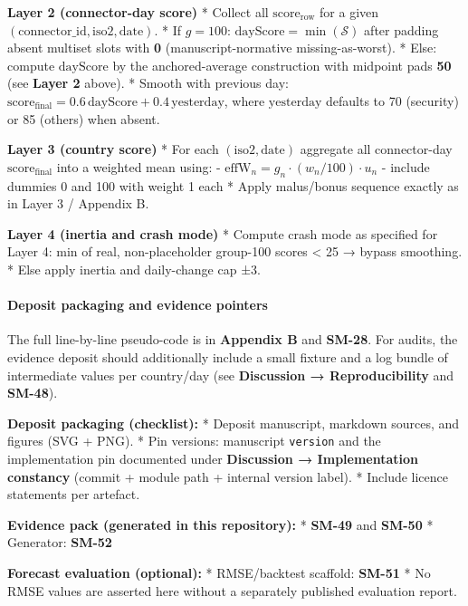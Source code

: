\documentclass[
  11pt,
  peerreview,journal,onecolumn]{IEEEtran}
\newcommand{\passthrough}[1]{#1}
\begin{document}
\textbf{Layer 2 (connector-day score)} * Collect all
\(\mathrm{score}_{\mathrm{row}}\) for a given
\((\mathrm{connector\_id},\mathrm{iso2},\mathrm{date})\). * If
\(g=100\): \(\mathrm{dayScore}=\min(\mathcal{S})\) after padding absent
multiset slots with \textbf{0} (manuscript-normative missing-as-worst).
* Else: compute \(\mathrm{dayScore}\) by the anchored-average
construction with midpoint pads \textbf{50} (see \textbf{Layer 2}
above). * Smooth with previous day:
\(\mathrm{score}_{\mathrm{final}}=0.6\,\mathrm{dayScore}+0.4\,\mathrm{yesterday}\),
where \(\mathrm{yesterday}\) defaults to 70 (security) or 85 (others)
when absent.

\textbf{Layer 3 (country score)} * For each
\((\mathrm{iso2},\mathrm{date})\) aggregate all connector-day
\(\mathrm{score}_{\mathrm{final}}\) into a weighted mean using: -
\(\mathrm{effW}_n=g_n\cdot(w_n/100)\cdot u_n\) - include dummies 0 and
100 with weight 1 each * Apply malus/bonus sequence exactly as in Layer
3 / Appendix B.

\textbf{Layer 4 (inertia and crash mode)} * Compute crash mode as
specified for Layer 4: min of real, non-placeholder group-100 scores
\textless{} 25 → bypass smoothing. * Else apply inertia and daily-change
cap ±3.

\hypertarget{deposit-packaging-and-evidence-pointers}{%
\paragraph{Deposit packaging and evidence
pointers}\label{deposit-packaging-and-evidence-pointers}}

The full line-by-line pseudo-code is in \textbf{Appendix B} and
\textbf{SM-28}. For audits, the evidence deposit should additionally
include a small fixture and a log bundle of intermediate values per
country/day (see \textbf{Discussion → Reproducibility} and
\textbf{SM-48}).

\textbf{Deposit packaging (checklist):} * Deposit manuscript, markdown
sources, and figures (SVG + PNG). * Pin versions: manuscript
\passthrough{\lstinline!version!} and the implementation pin documented
under \textbf{Discussion → Implementation constancy} (commit + module
path + internal version label). * Include licence statements per
artefact.

\textbf{Evidence pack (generated in this repository):} * \textbf{SM-49}
and \textbf{SM-50} * Generator: \textbf{SM-52}

\textbf{Forecast evaluation (optional):} * RMSE/backtest scaffold:
\textbf{SM-51} * No RMSE values are asserted here without a separately
published evaluation report.
\end{document}
